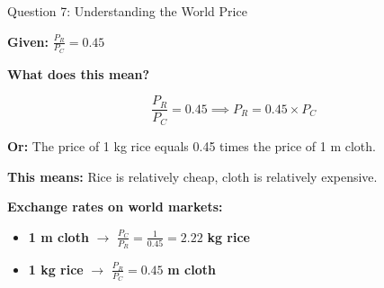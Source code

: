 \documentclass{beamer}
\begin{document}

\begin{frame}{Question 7: Understanding the World Price}

\textbf{Given:} $\frac{P_R}{P_C} = 0.45$

\vspace{0.3cm}

\textbf{What does this mean?}

$$\frac{P_R}{P_C} = 0.45 \implies P_R = 0.45 \times P_C$$

\vspace{0.2cm}

\textbf{Or:} The price of 1 kg rice equals 0.45 times the price of 1 m cloth.

\vspace{0.2cm}

\textbf{This means:} Rice is relatively cheap, cloth is relatively expensive.

\vspace{0.5cm}

\textbf{Exchange rates on world markets:}

\begin{itemize}
    \item \textbf{1 m cloth} $\rightarrow$ $\frac{P_C}{P_R} = \frac{1}{0.45} = 2.22$ \textbf{kg rice}
    \item \textbf{1 kg rice} $\rightarrow$ $\frac{P_R}{P_C} = 0.45$ \textbf{m cloth}
\end{itemize}

\end{frame}

\end{document}
